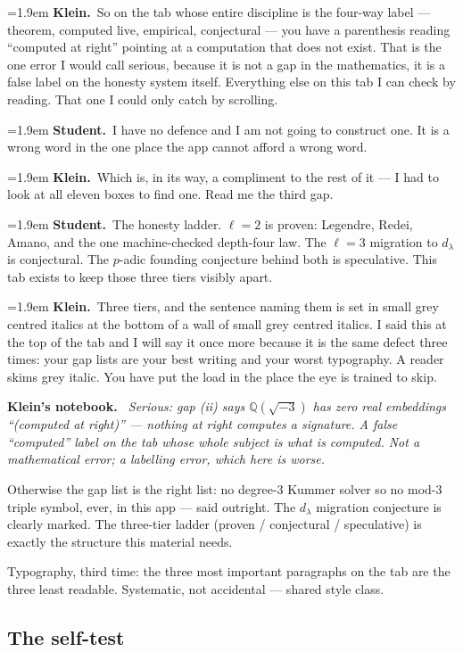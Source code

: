 \documentclass[11pt]{article}
\newcommand{\Stu}[1]{\par\smallskip\noindent\hangindent=1.9em\hangafter=1%
  \textcolor{stucol}{\textbf{Student.}}~#1\par}
\newcommand{\Kle}[1]{\par\smallskip\noindent\hangindent=1.9em\hangafter=1%
  \textcolor{klecol}{\textbf{Klein.}}~#1\par}
\newenvironment{knote}%
  {\begin{snugshade}\small\noindent\textbf{\textcolor{klecol}{Klein's notebook.}}\itshape\ }%
  {\end{snugshade}}
\begin{document}
\Kle{So on the tab whose entire discipline is the four-way label --- theorem, computed live, empirical, conjectural --- you have a parenthesis reading ``computed at right'' pointing at a computation that does not exist. That is the one error I would call serious, because it is not a gap in the mathematics, it is a false label on the honesty system itself. Everything else on this tab I can check by reading. That one I could only catch by scrolling.}

\Stu{I have no defence and I am not going to construct one. It is a wrong word in the one place the app cannot afford a wrong word.}

\Kle{Which is, in its way, a compliment to the rest of it --- I had to look at all eleven boxes to find one. Read me the third gap.}

\Stu{The honesty ladder. $\ell = 2$ is proven: Legendre, Redei, Amano, and the one machine-checked depth-four law. The $\ell = 3$ migration to $d_\lambda$ is conjectural. The $p$-adic founding conjecture behind both is speculative. This tab exists to keep those three tiers visibly apart.}

\Kle{Three tiers, and the sentence naming them is set in small grey centred italics at the bottom of a wall of small grey centred italics. I said this at the top of the tab and I will say it once more because it is the same defect three times: your gap lists are your best writing and your worst typography. A reader skims grey italic. You have put the load in the place the eye is trained to skip.}

\begin{knote}
Serious: gap (ii) says $\mathbb{Q}(\sqrt{-3})$ has zero real embeddings ``(computed at right)'' --- nothing at right computes a signature. A false ``computed'' label on the tab whose whole subject is what is computed. Not a mathematical error; a labelling error, which here is worse.

Otherwise the gap list is the right list: no degree-3 Kummer solver so no mod-3 triple symbol, ever, in this app --- said outright. The $d_\lambda$ migration conjecture is clearly marked. The three-tier ladder (proven / conjectural / speculative) is exactly the structure this material needs.

Typography, third time: the three most important paragraphs on the tab are the three least readable. Systematic, not accidental --- shared style class.
\end{knote}

\subsection*{The self-test}
\end{document}
